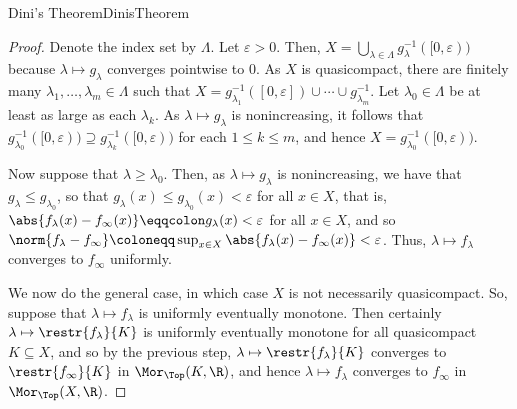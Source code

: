 \begin{prp}{Dini's Theorem}{DinisTheorem}
\begin{proof}
Denote the index set by $\Lambda$.  Let $\varepsilon >0$.  Then, $X=\bigcup _{\lambda \in \Lambda}g_{\lambda}^{-1}([0,\varepsilon ))$ because $\lambda \mapsto g_{\lambda}$ converges pointwise to $0$.  As $X$ is quasicompact, there are finitely many $\lambda _1,\ldots ,\lambda _m\in \Lambda$ such that $X=g_{\lambda _1}^{-1}([0,\varepsilon ])\cup \cdots \cup g_{\lambda _m}^{-1}$.  Let $\lambda _0\in \Lambda$ be at least as large as each $\lambda _k$.  As $\lambda \mapsto g_{\lambda}$ is nonincreasing, it follows that $g_{\lambda _0}^{-1}([0,\varepsilon ))\supseteq g_{\lambda _k}^{-1}([0,\varepsilon ))$ for each $1\leq k\leq m$, and hence $X=g_{\lambda _0}^{-1}([0,\varepsilon ))$.

Now suppose that $\lambda \geq \lambda _0$.  Then, as $\lambda \mapsto g_{\lambda}$ is nonincreasing, we have that $g_{\lambda}\leq g_{\lambda _0}$, so that $g_{\lambda}(x)\leq g_{\lambda _0}(x)<\varepsilon$ for all $x\in X$, that is, $\abs{f_{\lambda}(x)-f_{\infty}(x)}\eqqcolon g_{\lambda}(x)<\varepsilon$ for all $x\in X$, and so $\norm{f_{\lambda}-f_{\infty}}\coloneqq \sup _{x\in X}\abs{f_{\lambda}(x)-f_{\infty}(x)}<\varepsilon$.  Thus, $\lambda \mapsto f_{\lambda}$ converges to $f_{\infty}$ uniformly.

We now do the general case, in which case $X$ is not necessarily quasicompact.  So, suppose that $\lambda \mapsto f_{\lambda}$ is uniformly eventually monotone.  Then certainly $\lambda \mapsto \restr{f_{\lambda}}{K}$ is uniformly eventually monotone for all quasicompact $K\subseteq X$, and so by the previous step, $\lambda \mapsto \restr{f_{\lambda}}{K}$ converges to $\restr{f_{\infty}}{K}$ in $\Mor _{\Top}(K,\R )$, and hence $\lambda \mapsto f_{\lambda}$ converges to $f_{\infty}$ in $\Mor _{\Top}(X,\R )$.
\end{proof}
\end{prp}
